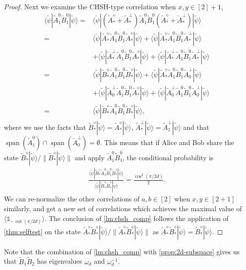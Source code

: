 \documentclass[11pt,letterpaper]{article}
\newcommand{\ket}[1]{|#1\rangle}
\newcommand{\bra}[1]{\langle#1|}
\DeclareMathOperator{\spn}{span}
\newcommand{\1}{\mathbb{1}}
\newcommand{\tA}{\tilde{A}}
\newcommand{\tB}{\tilde{B}}
\newcommand{\tpsi}{\tilde{\psi}}
\theoremstyle{definition}
\begin{document}
\begin{proof}
Next we examine the CHSH-type correlation when $x,y \in [2]+1$,
\begin{align*}
	   \bra{\tpsi} \tA_1^0\tB_1^0 \ket{\tpsi} 
	= &\bra{\tpsi}(\tA_\ast^\diamond + \tA_\ast^\perp) \tA_1^0\tB_1^0 (\tA_\ast^\diamond + \tA_\ast^\perp)\ket{\tpsi} \\
	= & \bra{\tpsi}\tA_\ast^\diamond \tA_1^0\tB_1^0 \tA_\ast^\diamond\ket{\tpsi} + \bra{\tpsi}\tA_\ast^\diamond \tA_1^0\tB_1^0 \tA_\ast^\perp\ket{\tpsi} \\
	&+\bra{\tpsi}\tA_\ast^\perp \tA_1^0\tB_1^0 \tA_\ast^\diamond\ket{\tpsi} + \bra{\tpsi}\tA_\ast^\perp \tA_1^0\tB_1^0 \tA_\ast^\perp\ket{\tpsi}\\
	= & \bra{\tpsi}\tB_\ast^\diamond \tA_1^0\tB_1^0 \tB_\ast^\diamond\ket{\tpsi} + \bra{\tpsi}\tA_\ast^\diamond \tA_1^0\tB_1^0 \tA_0^\perp\ket{\tpsi} \\
	&+\bra{\tpsi}\tA_0^\perp \tA_1^0\tB_1^0 \tA_\ast^\diamond\ket{\tpsi} + \bra{\tpsi}\tA_0^\perp \tA_1^0\tB_1^0 \tA_0^\perp\ket{\tpsi}\\
	=&\bra{\tpsi}\tB_\ast^\diamond \tA_1^0\tB_1^0 \tB_\ast^\diamond\ket{\tpsi},
\end{align*}
where we use the facts that $\tB_\ast^\diamond \ket{\tpsi} = \tA_\ast^\diamond \ket{\tpsi}$, $\tA_\ast^\perp \ket{\tpsi} = \tA_1^\perp \ket{\tpsi}$ and that 
$\spn(\tA_1^0) \cap \spn(\tA_0^\perp) = \emptyset$. 
This means that if Alice and Bob share the state $\tB_\ast^\diamond \ket{\tpsi}/\|\tB_\ast^\diamond \ket{\tpsi}\|$ and apply 
$\tA_1^0\tB_1^0$, the conditional probability is
\begin{align}
	\frac{\bra{\tpsi}\tB_\ast^\diamond \tA_1^0\tB_1^0 \tB_\ast^\diamond\ket{\tpsi}}{\bra{\tpsi} \tB_\ast^\diamond \tB_\ast^\diamond \ket{\tpsi}} = \frac{\cos^2(\pi/2d)}{2}.
\end{align} 
We can re-normalize the other correlations of $a,b \in [2]$ when $x,y \in [2+1]$ similarly, and get a new set of correlations 
which achieves the maximal value of $\langle \1_{-\cot(\pi/2d)}\rangle$. 
The conclusion of \cref{lm:chsh_comp} follows the application of \cref{thm:selftest} on the state $\tA_\ast^\diamond\tB_\ast^\diamond \ket{\tpsi}/\|\tA_\ast^\diamond\tB_\ast^\diamond \ket{\tpsi}\|$ as $\tA_\ast^\diamond\tB_\ast^\diamond \ket{\tpsi} = \tB_\ast^\diamond \ket{\tpsi}$.
\end{proof}
Note that the combination of \cref{lm:chsh_comp} with \cref{prop:2d-subspace} gives us that 
$\tB_1\tB_2$ has eigenvalues $\omega_d$ and $\omega_d^{-1}$.
\end{document}

